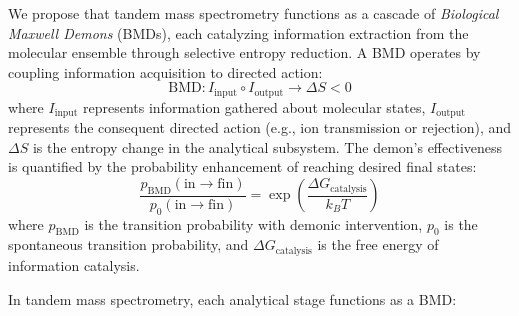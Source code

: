 \documentclass[11pt,twocolumn]{article}
\begin{document}
We propose that tandem mass spectrometry functions as a cascade of \textit{Biological Maxwell Demons} (BMDs), each catalyzing information extraction from the molecular ensemble through selective entropy reduction. A BMD operates by coupling information acquisition to directed action:
\begin{equation}
    \text{BMD}: I_{\text{input}} \circ I_{\text{output}} \rightarrow \Delta S < 0
\end{equation}
where $I_{\text{input}}$ represents information gathered about molecular states, $I_{\text{output}}$ represents the consequent directed action (e.g., ion transmission or rejection), and $\Delta S$ is the entropy change in the analytical subsystem. The demon's effectiveness is quantified by the probability enhancement of reaching desired final states:
\begin{equation}
    \frac{p_{\text{BMD}}(\text{in} \rightarrow \text{fin})}{p_{0}(\text{in} \rightarrow \text{fin})} = \exp\left(\frac{\Delta G_{\text{catalysis}}}{k_B T}\right)
\end{equation}
where $p_{\text{BMD}}$ is the transition probability with demonic intervention, $p_0$ is the spontaneous transition probability, and $\Delta G_{\text{catalysis}}$ is the free energy of information catalysis.

In tandem mass spectrometry, each analytical stage functions as a BMD:
\end{document}
